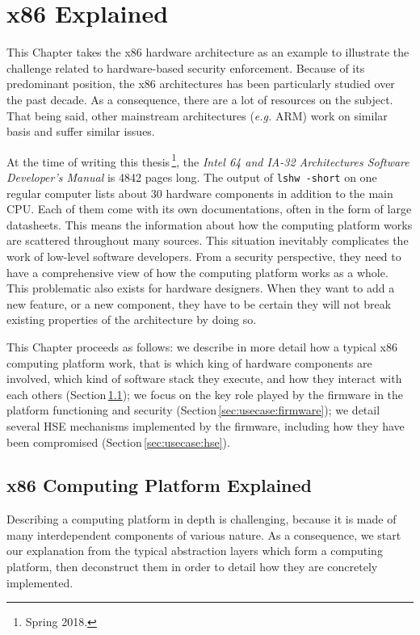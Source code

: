 \chapter{x86 Explained}
\label{chapter:usecase}

This Chapter takes the x86 hardware architecture as an example to illustrate the
challenge related to hardware-based security enforcement.
%
Because of its predominant position, the x86 architectures has been particularly
studied over the past decade.
%
As a consequence, there are a lot of resources on the subject.
%
That being said, other mainstream architectures (\emph{e.g.} ARM) work on
similar basis and suffer similar issues.

At the time of writing this thesis\,\footnote{Spring 2018.}, the \emph{Intel 64
  and IA-32 Architectures Software Developer’s Manual} is 4842 pages long.
%
The output of \texttt{lshw -short} on one regular computer lists about 30
hardware components in addition to the main CPU.
%
Each of them come with its own documentations, often in the form of large
datasheets.
%
This means the information about how the computing platform works are scattered
throughout many sources.
%
This situation inevitably complicates the work of low-level software developers.
%
From a security perspective, they need to have a comprehensive view of how the
computing platform works as a whole.
%
This problematic also exists for hardware designers.
%
When they want to add a new feature, or a new component, they have to be certain
they will not break existing properties of the architecture by doing so.

This Chapter proceeds as follows:
%
we describe in more detail how a typical x86 computing platform work, that is
which king of hardware components are involved, which kind of software stack
they execute, and how they interact with each others
(Section\,\ref{sec:usecase:architecture});
%
we focus on the key role played by the firmware in the platform functioning and
security (Section\,\ref{sec:usecase:firmware});
%
we detail several HSE mechanisms implemented by the firmware, including how they
have been compromised (Section\,\ref{sec:usecase:hse}).

\section{x86 Computing Platform Explained}
\label{sec:usecase:architecture}

Describing a computing platform in depth is challenging, because it is made of
many interdependent components of various nature.
%
As a consequence, we start our explanation from the typical abstraction layers
which form a computing platform, then deconstruct them in order to detail how
they are concretely implemented.

